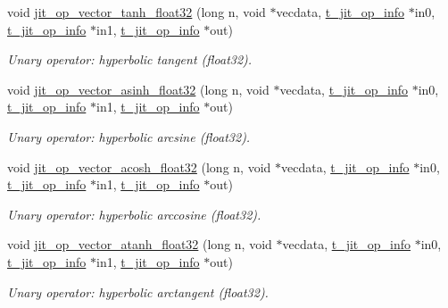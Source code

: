 \begin{DoxyCompactItemize}
void \hyperlink{group__opvecmod_ga563f5161f3b5f3262cdde07883cfcfd5}{jit\_\-op\_\-vector\_\-tanh\_\-float32} (long n, void $\ast$vecdata, \hyperlink{structt__jit__op__info}{t\_\-jit\_\-op\_\-info} $\ast$in0, \hyperlink{structt__jit__op__info}{t\_\-jit\_\-op\_\-info} $\ast$in1, \hyperlink{structt__jit__op__info}{t\_\-jit\_\-op\_\-info} $\ast$out)
\begin{DoxyCompactList}\small\item\em Unary operator: hyperbolic tangent (float32). \item\end{DoxyCompactList}\item 
void \hyperlink{group__opvecmod_ga89dcc71ebb58320ca582b2bfb59b1566}{jit\_\-op\_\-vector\_\-asinh\_\-float32} (long n, void $\ast$vecdata, \hyperlink{structt__jit__op__info}{t\_\-jit\_\-op\_\-info} $\ast$in0, \hyperlink{structt__jit__op__info}{t\_\-jit\_\-op\_\-info} $\ast$in1, \hyperlink{structt__jit__op__info}{t\_\-jit\_\-op\_\-info} $\ast$out)
\begin{DoxyCompactList}\small\item\em Unary operator: hyperbolic arcsine (float32). \item\end{DoxyCompactList}\item 
void \hyperlink{group__opvecmod_gaa737541b153a2de2a2a2a7877ce89394}{jit\_\-op\_\-vector\_\-acosh\_\-float32} (long n, void $\ast$vecdata, \hyperlink{structt__jit__op__info}{t\_\-jit\_\-op\_\-info} $\ast$in0, \hyperlink{structt__jit__op__info}{t\_\-jit\_\-op\_\-info} $\ast$in1, \hyperlink{structt__jit__op__info}{t\_\-jit\_\-op\_\-info} $\ast$out)
\begin{DoxyCompactList}\small\item\em Unary operator: hyperbolic arccosine (float32). \item\end{DoxyCompactList}\item 
void \hyperlink{group__opvecmod_gab141096b192c0b8e4cd6a22d7137ff5b}{jit\_\-op\_\-vector\_\-atanh\_\-float32} (long n, void $\ast$vecdata, \hyperlink{structt__jit__op__info}{t\_\-jit\_\-op\_\-info} $\ast$in0, \hyperlink{structt__jit__op__info}{t\_\-jit\_\-op\_\-info} $\ast$in1, \hyperlink{structt__jit__op__info}{t\_\-jit\_\-op\_\-info} $\ast$out)
\begin{DoxyCompactList}\small\item\em Unary operator: hyperbolic arctangent (float32). \item\end{DoxyCompactList}\item 

\end{DoxyCompactItemize}
